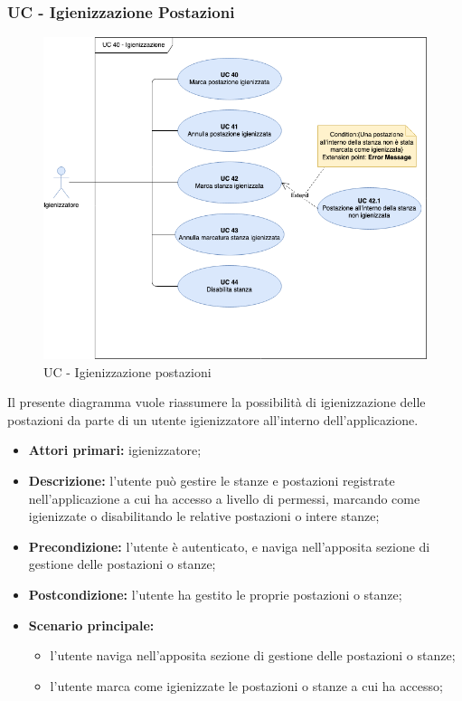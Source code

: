 \subsubsection{UC - Igienizzazione Postazioni}

\begin{figure}[h]
  \centering
    \includegraphics[scale=0.5]{src/CasiDUso/Immagini/UC40.png}
  \caption{UC  - Igienizzazione postazioni}
\end{figure}

Il presente diagramma vuole riassumere la possibilità di igienizzazione delle postazioni da parte di un utente igienizzatore all'interno dell’applicazione.

\begin{itemize}
\item \textbf{Attori primari:} igienizzatore;
\item \textbf{Descrizione:} l’utente può gestire le stanze e postazioni registrate nell’applicazione a cui ha accesso a livello di permessi, marcando come igienizzate o disabilitando le relative postazioni o intere stanze;
\item \textbf{Precondizione:} l'utente è autenticato, e naviga nell’apposita sezione di gestione delle postazioni o stanze;
\item \textbf{Postcondizione:} l’utente ha gestito le proprie postazioni o stanze;
\item \textbf{Scenario principale:} 
	\begin{itemize}
		\item l’utente naviga nell’apposita sezione di gestione delle postazioni o stanze;
		\item l’utente marca come igienizzate le postazioni o stanze a cui ha accesso;
	\end{itemize}
\end{itemize}

